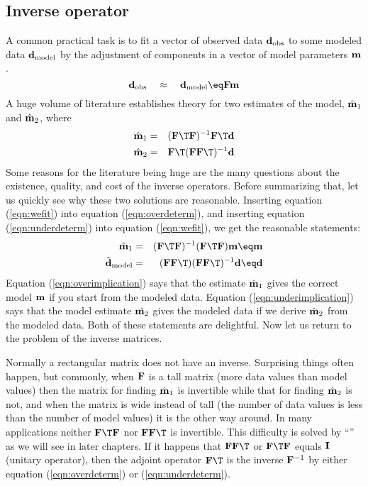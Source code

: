 \subsection{Inverse operator}
A common practical task is to fit a vector of observed data
$\bold d_{\rm obs}$
to some modeled data
$\bold d_{\rm model}$
by the adjustment of components in a vector of model parameters $\bold m$.
\begin{equation}
\bold d_{\rm obs}
\quad\approx\quad
\bold d_{\rm model}
\eq
\bold F \bold m
\label{eqn:wefit}
\end{equation}
A huge volume of literature establishes theory for two estimates
of the model,
$\hat {\bold m}_1$ and
$\hat {\bold m}_2$, where
\begin{eqnarray}
\hat {\bold m}_1 &=& (\bold F\T\bold F)^{-1}\bold F\T\bold d
                                                \label{eqn:overdeterm} \\
\hat {\bold m}_2 &=& \bold F\T(\bold F\bold F\T)^{-1}\bold d
                                                \label{eqn:underdeterm}
\end{eqnarray}
Some reasons for the literature being huge are the
many questions
about the existence, quality, and cost
of the inverse operators.
Before summarizing that,
let us quickly see why these two solutions are reasonable.
Inserting equation
(\ref{eqn:wefit})
into equation
(\ref{eqn:overdeterm}),
and inserting equation
(\ref{eqn:underdeterm})
into equation
(\ref{eqn:wefit}),
we get the reasonable statements:
\begin{eqnarray}
\hat {\bold m}_1 &=& (\bold F\T\bold F)^{-1}(\bold F\T\bold F)\bold m \eq\bold m
                                                \label{eqn:overimplication} \\
\hat {\bold d}_{\rm model} &=&
                     (\bold F\bold F\T)(\bold F\bold F\T)^{-1}\bold d \eq\bold d
                                                \label{eqn:underimplication}
\end{eqnarray}
Equation (\ref{eqn:overimplication}) says that the estimate $\hat {\bold m}_1$
gives the correct model $\bold m$
if you start from the modeled data.
Equation (\ref{eqn:underimplication}) says that the model estimate $\hat {\bold m_2}$
gives the modeled data if we derive $\hat{\bold m}_2$
from the modeled data.
Both of these statements are delightful.
Now let us return to the problem of the inverse matrices.
\par
Normally a rectangular matrix does not have an inverse.
Surprising things often happen, but commonly,
when $\bold F$ is a tall matrix 
(more data values than model values)
then the matrix for finding
$\hat{\bold m}_1$
is invertible while that for finding
$\hat{\bold m}_2$
is not,
and when the matrix is wide instead of tall
(the number of data values is less than the number of model values)
it is the other way around.
In many applications neither
$\bold F\T\bold F$ nor
$\bold F\bold F\T$ 
is invertible.  This difficulty is
solved by ``'' as we will see in later chapters.
If it happens that
$\bold F \bold F\T$
or
$\bold F\T \bold F$
equals $\bold I$ (unitary operator),
then the adjoint operator $\bold F\T$ is the inverse $\bold F^{-1}$
by either equation (\ref{eqn:overdeterm}) or (\ref{eqn:underdeterm}).

